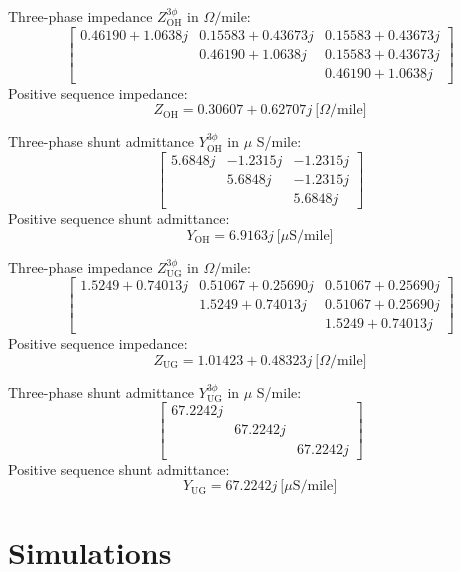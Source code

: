 \documentclass[10pt,letterpaper]{article}
\begin{document}
\noindent Three-phase impedance $Z_\text{OH}^{3\phi}$ in $\Omega/\text{mile}$:
$$
\begin{bmatrix}
0.46190 + 1.0638j 	& 0.15583 + 0.43673j 	& 0.15583 + 0.43673j \\
  					& 0.46190 + 1.0638j		& 0.15583 + 0.43673j \\
					&						& 0.46190 + 1.0638j
\end{bmatrix}
$$
Positive sequence impedance:
$$
Z_\text{OH} = 0.30607 + 0.62707j \ \text{[$\Omega$/mile]}
$$

\noindent Three-phase shunt admittance $Y_\text{OH}^{3\phi}$ in $\mu$ S/mile:
$$
\begin{bmatrix}
5.6848j 	& -1.2315j 	& -1.2315j \\
  					& 5.6848j		& -1.2315j \\
					&						& 5.6848j
\end{bmatrix}
$$
Positive sequence shunt admittance:
$$
Y_\text{OH} = 6.9163j \ \text{[$\mu$S/mile]}
$$


Three-phase impedance $Z_\text{UG}^{3\phi}$ in $\Omega/\text{mile}$:
$$
\begin{bmatrix}
1.5249 + 0.74013j	& 0.51067 + 0.25690j	& 0.51067 + 0.25690j \\
					& 1.5249 + 0.74013j	& 0.51067 + 0.25690j \\
					&						& 1.5249 + 0.74013j
\end{bmatrix}
$$
Positive sequence impedance:
$$
Z_\text{UG} =  1.01423 + 0.48323j \ \text{[$\Omega$/mile]}
$$

Three-phase shunt admittance $Y_\text{UG}^{3\phi}$ in $\mu$ S/mile:
$$
\begin{bmatrix}
67.2242j 	&  	&  \\
  					& 67.2242j		&  \\
					&						& 67.2242j
\end{bmatrix}
$$
Positive sequence shunt admittance:
$$
Y_\text{UG} = 67.2242j \ \text{[$\mu$S/mile]}
$$




%

\section{Simulations}
\end{document}
